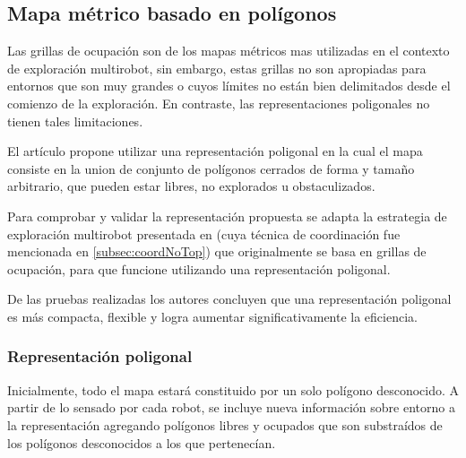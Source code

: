 \subsection{Mapa métrico basado en polígonos}
Las grillas de ocupación son de los mapas métricos mas utilizadas en el contexto de exploración multirobot, sin embargo, estas grillas no son apropiadas para entornos que son muy grandes o cuyos límites no están bien delimitados desde el comienzo de la exploración. En contraste, las representaciones poligonales no tienen tales limitaciones.

El artículo \cite{wu2007voronoi} propone utilizar una representación poligonal en la cual el mapa consiste en la union de conjunto de polígonos cerrados de forma y tamaño arbitrario, que pueden estar libres, no explorados u obstaculizados. 

Para comprobar y validar la representación propuesta se adapta la estrategia de exploración multirobot presentada en \cite{Solanas2004} (cuya técnica de coordinación fue mencionada en \ref{subsec:coordNoTop}) que originalmente se basa en grillas de ocupación, para que funcione utilizando una representación poligonal.

De las pruebas realizadas los autores concluyen que una representación poligonal es más compacta, flexible y logra aumentar significativamente la eficiencia.


\subsubsection{Representación poligonal}
Inicialmente, todo el mapa estará constituido por un solo polígono desconocido. A partir de lo sensado por cada robot, se incluye nueva información sobre entorno a la representación agregando polígonos libres y ocupados que son substraídos de los polígonos desconocidos a los que pertenecían.

